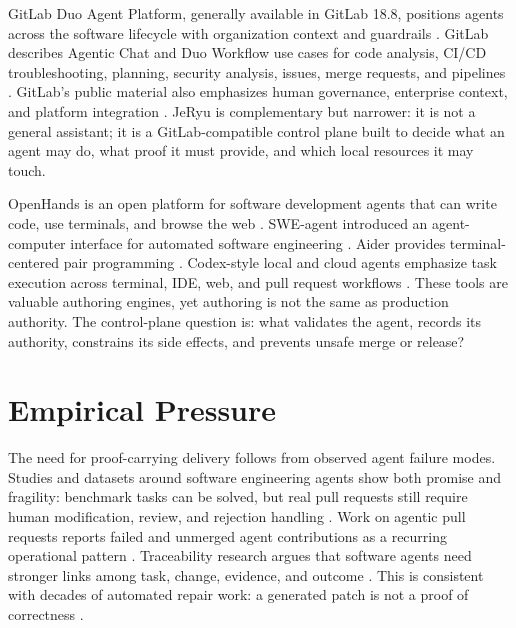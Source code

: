 \documentclass[conference]{IEEEtran}
\begin{document}
GitLab Duo Agent Platform, generally available in GitLab 18.8, positions agents across the software lifecycle with organization context and guardrails \cite{gitlab-duo-ga,gitlab-18-8}. GitLab describes Agentic Chat and Duo Workflow use cases for code analysis, CI/CD troubleshooting, planning, security analysis, issues, merge requests, and pipelines \cite{gitlab-duo-platform,gitlab-duo-workflow,gitlab-agent-platform-intro,gitlab-duo-workflow-blog}. GitLab's public material also emphasizes human governance, enterprise context, and platform integration \cite{gitlab-duo-handbook}. JeRyu is complementary but narrower: it is not a general assistant; it is a GitLab-compatible control plane built to decide what an agent may do, what proof it must provide, and which local resources it may touch.

OpenHands is an open platform for software development agents that can write code, use terminals, and browse the web \cite{openhands-paper,openhands-site,openhands-repo}. SWE-agent introduced an agent-computer interface for automated software engineering \cite{sweagent-paper}. Aider provides terminal-centered pair programming \cite{aider-repo}. Codex-style local and cloud agents emphasize task execution across terminal, IDE, web, and pull request workflows \cite{openai-codex,github-openai-codex,openai-codex-system-card}. These tools are valuable authoring engines, yet authoring is not the same as production authority. The control-plane question is: what validates the agent, records its authority, constrains its side effects, and prevents unsafe merge or release?

\section{Empirical Pressure}
The need for proof-carrying delivery follows from observed agent failure modes. Studies and datasets around software engineering agents show both promise and fragility: benchmark tasks can be solved, but real pull requests still require human modification, review, and rejection handling \cite{swebench,swebench-verified,aidev-dataset,agent-pr-modifications}. Work on agentic pull requests reports failed and unmerged agent contributions as a recurring operational pattern \cite{failed-agentic-prs,agent-prs-unmerged}. Traceability research argues that software agents need stronger links among task, change, evidence, and outcome \cite{software-agents-traceability}. This is consistent with decades of automated repair work: a generated patch is not a proof of correctness \cite{repair-survey}.
\end{document}
